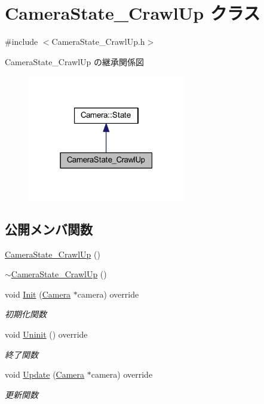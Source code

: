 \hypertarget{class_camera_state___crawl_up}{}\section{Camera\+State\+\_\+\+Crawl\+Up クラス}
\label{class_camera_state___crawl_up}


{\ttfamily \#include $<$Camera\+State\+\_\+\+Crawl\+Up.\+h$>$}



Camera\+State\+\_\+\+Crawl\+Up の継承関係図\nopagebreak
\begin{figure}[H]
\begin{center}
\leavevmode
\includegraphics[width=195pt]{class_camera_state___crawl_up__inherit__graph}
\end{center}
\end{figure}
\subsection*{公開メンバ関数}
\begin{DoxyCompactItemize}
\item 
\mbox{\hyperlink{class_camera_state___crawl_up_a75741967576f6f544007ad8ccc574202}{Camera\+State\+\_\+\+Crawl\+Up}} ()
\item 
\mbox{\hyperlink{class_camera_state___crawl_up_a9b7f2e6cc8be5c356967d8df8c20e93a}{$\sim$\+Camera\+State\+\_\+\+Crawl\+Up}} ()
\item 
void \mbox{\hyperlink{class_camera_state___crawl_up_a43a47eb4e7445c6801e8316c5a635709}{Init}} (\mbox{\hyperlink{class_camera}{Camera}} $\ast$camera) override
\begin{DoxyCompactList}\small\item\em 初期化関数 \end{DoxyCompactList}\item 
void \mbox{\hyperlink{class_camera_state___crawl_up_a046ec18a91e31b210ae000133fa6113a}{Uninit}} () override
\begin{DoxyCompactList}\small\item\em 終了関数 \end{DoxyCompactList}\item 
void \mbox{\hyperlink{class_camera_state___crawl_up_aaebd2634f1677b7c00e6761ed91e1264}{Update}} (\mbox{\hyperlink{class_camera}{Camera}} $\ast$camera) override
\begin{DoxyCompactList}\small\item\em 更新関数 \end{DoxyCompactList}\end{DoxyCompactItemize}
